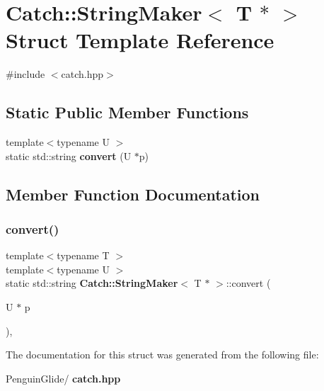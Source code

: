 \section{Catch\+::String\+Maker$<$ T $\ast$ $>$ Struct Template Reference}
\label{struct_catch_1_1_string_maker_3_01_t_01_5_01_4}


{\ttfamily \#include $<$catch.\+hpp$>$}

\subsection*{Static Public Member Functions}
\begin{DoxyCompactItemize}
\item 
{\footnotesize template$<$typename U $>$ }\\static std\+::string \textbf{ convert} (U $\ast$p)
\end{DoxyCompactItemize}


\subsection{Member Function Documentation}
\mbox{\label{struct_catch_1_1_string_maker_3_01_t_01_5_01_4_a2adbc75c99d71b8323f4052bcb0815c9}} 
\subsubsection{convert()}
{\footnotesize\ttfamily template$<$typename T $>$ \\
template$<$typename U $>$ \\
static std\+::string \textbf{ Catch\+::\+String\+Maker}$<$ T $\ast$ $>$\+::convert (\begin{DoxyParamCaption}\item[{U $\ast$}]{p }\end{DoxyParamCaption})\hspace{0.3cm}{\ttfamily [inline]}, {\ttfamily [static]}}



The documentation for this struct was generated from the following file\+:\begin{DoxyCompactItemize}
\item 
Penguin\+Glide/\textbf{ catch.\+hpp}\end{DoxyCompactItemize}
